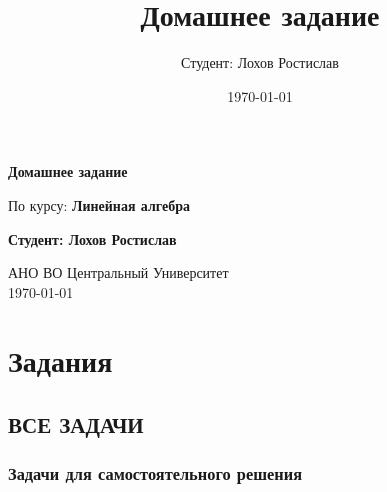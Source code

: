 \documentclass[a4paper,12pt]{article}
\title{Домашнее задание}
\author{Студент: Лохов Ростислав}
\date{\today}
\begin{document}
\begin{titlepage}
    \centering
    \vspace{1cm}

    \Huge
    \textbf{Домашнее задание}

    \vspace{0.5cm}
    \LARGE
    По курсу: \textbf{Линейная алгебра}

    \vspace{1.5cm}

    \textbf{Студент: Лохов Ростислав}

    \vfill

    \Large
    АНО ВО Центральный Университет\\
    \vspace{0.3cm}
    \today

\end{titlepage}

\tableofcontents
\newpage

\section{Задания}

\subsection*{ВСЕ ЗАДАЧИ}

\subsubsection*{Задачи для самостоятельного решения}
\end{document}

